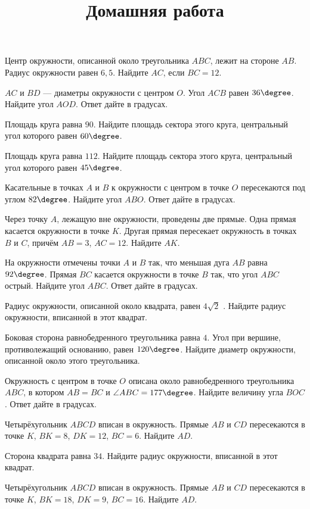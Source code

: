 \begin{consultation}
	\begin{listofex}
		\item Центр окружности, описанной около треугольника \( ABC \), лежит на стороне \( AB \). Радиус окружности равен \( 6,5 \). Найдите \( AC \), если \( BC=12 \).
		\item \( AC \) и \( BD \) --- диаметры окружности с центром \( O \). Угол \( ACB \) равен \( 36\degree \). Найдите угол \( AOD \). Ответ дайте в градусах.
		\item Площадь круга равна \( 90 \). Найдите площадь сектора этого круга, центральный угол которого равен \( 60\degree \).
		\item Площадь круга равна \( 112 \). Найдите площадь сектора этого круга, центральный угол которого равен \( 45\degree \).
		\item Касательные в точках \( A \) и \( B \) к окружности с центром в точке \( O \) пересекаются под углом \( 82\degree \). Найдите угол \( ABO \). Ответ дайте в градусах.
		\item Через точку \( A \), лежащую вне окружности, проведены две прямые. Одна прямая касается окружности в точке \( K \). Другая прямая пересекает окружность в точках \( B \) и \( C \), причём \( AB=3 \), \( AC=12 \). Найдите \( AK \).
		\item На окружности отмечены точки \( A \) и \( B \) так, что меньшая дуга \( AB \) равна \( 92\degree \). Прямая \( BC \) касается окружности в точке \( B \) так, что угол \( ABC \) острый. Найдите угол \( ABC \). Ответ дайте в градусах.
		\item Радиус окружности, описанной около квадрата, равен \( 4\sqrt{2} \) . Найдите радиус окружности, вписанной в этот квадрат.
		\item Боковая сторона равнобедренного треугольника равна \( 4 \). Угол при вершине, противолежащий основанию, равен \( 120\degree \). Найдите диаметр окружности, описанной около этого треугольника.
		\item Окружность с центром в точке \( O \) описана около равнобедренного треугольника \( ABC \), в котором \( AB=BC \) и \( \angle ABC=177\degree \). Найдите величину угла \( BOC \). Ответ дайте в градусах.
		\item Четырёхугольник \( ABCD \) вписан в окружность. Прямые \( AB \) и \( CD \) пересекаются в точке \( K \), \( BK=8 \), \( DK=12 \), \( BC=6 \). Найдите \( AD \).
	\end{listofex}
	\newpage
	\title{Домашняя работа}
	\begin{listofex}
		\item Сторона квадрата равна \( 34 \). Найдите радиус окружности, вписанной в этот квадрат.
		\item Четырёхугольник \( ABCD \) вписан в окружность. Прямые \( AB \) и \( CD \) пересекаются в точке \( K \), \( BK=18 \), \( DK=9 \), \( BC=16 \). Найдите \( AD \).
	\end{listofex}
\end{consultation}
